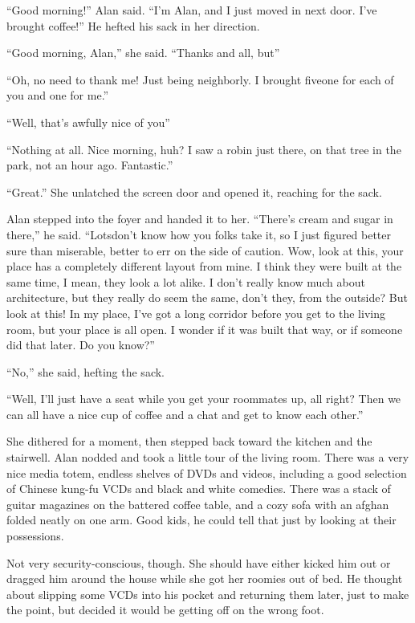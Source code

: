 ``Good morning!'' Alan said.  ``I'm Alan, and I just moved in next
door.  I've brought coffee!'' He hefted his sack in her direction.

``Good morning, Alan,'' she said.  ``Thanks and all, but\dash{}''

``Oh, no need to thank me!  Just being neighborly.  I brought
five\dash{}one for each of you and one for me.''

``Well, that's awfully nice of you\dash{}''

``Nothing at all.  Nice morning, huh?  I saw a robin just there, on
that tree in the park, not an hour ago.  Fantastic.''

``Great.'' She unlatched the screen door and opened it, reaching for
the sack.

Alan stepped into the foyer and handed it to her.  ``There's cream and
sugar in there,'' he said.  ``Lots\dash{}don't know how you folks take it,
so I just figured better sure than miserable, better to err on the
side of caution.  Wow, look at this, your place has a completely
different layout from mine.  I think they were built at the same time,
I mean, they look a lot alike.  I don't really know much about
architecture, but they really do seem the same, don't they, from the
outside?  But look at this!  In my place, I've got a long corridor
before you get to the living room, but your place is all open.  I
wonder if it was built that way, or if someone did that later.  Do you
know?''

``No,'' she said, hefting the sack.

``Well, I'll just have a seat while you get your roommates up, all
right?  Then we can all have a nice cup of coffee and a chat and get
to know each other.''

She dithered for a moment, then stepped back toward the kitchen and
the stairwell.  Alan nodded and took a little tour of the living room. 
There was a very nice media totem, endless shelves of DVDs and videos,
including a good selection of Chinese kung-fu VCDs and black and white
comedies.  There was a stack of guitar magazines on the battered
coffee table, and a cozy sofa with an afghan folded neatly on one arm. 
Good kids, he could tell that just by looking at their possessions.

Not very security-conscious, though.  She should have either kicked
him out or dragged him around the house while she got her roomies out
of bed.  He thought about slipping some VCDs into his pocket and
returning them later, just to make the point, but decided it would be
getting off on the wrong foot.


